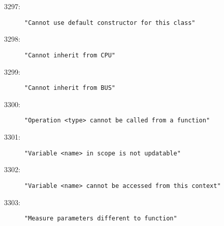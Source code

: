 \begin{description}
\item[3297:] \texttt{"Cannot use default constructor for this class"}
\item[3298:] \texttt{"Cannot inherit from CPU"}
\item[3299:] \texttt{"Cannot inherit from BUS"}
\item[3300:] \texttt{"Operation <type> cannot be called from a function"}
\item[3301:] \texttt{"Variable <name> in scope is not updatable"}
\item[3302:] \texttt{"Variable <name> cannot be accessed from this context"}
\item[3303:] \texttt{"Measure parameters different to function"}
\end{description}
